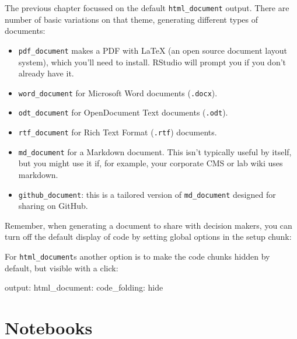 \documentclass[]{book}
\newenvironment{Shaded}{\begin{snugshade}}{\end{snugshade}}
\newcommand{\KeywordTok}[1]{\textcolor[rgb]{0.13,0.29,0.53}{\textbf{{#1}}}}
\newcommand{\DataTypeTok}[1]{\textcolor[rgb]{0.13,0.29,0.53}{{#1}}}
\newcommand{\OtherTok}[1]{\textcolor[rgb]{0.56,0.35,0.01}{{#1}}}
\newcommand{\FunctionTok}[1]{\textcolor[rgb]{0.00,0.00,0.00}{{#1}}}
\newcommand{\NormalTok}[1]{{#1}}
\begin{document}
The previous chapter focussed on the default \texttt{html\_document}
output. There are number of basic variations on that theme, generating
different types of documents:

\begin{itemize}
\item
  \texttt{pdf\_document} makes a PDF with LaTeX (an open source document
  layout system), which you'll need to install. RStudio will prompt you
  if you don't already have it.
\item
  \texttt{word\_document} for Microsoft Word documents (\texttt{.docx}).
\item
  \texttt{odt\_document} for OpenDocument Text documents
  (\texttt{.odt}).
\item
  \texttt{rtf\_document} for Rich Text Format (\texttt{.rtf}) documents.
\item
  \texttt{md\_document} for a Markdown document. This isn't typically
  useful by itself, but you might use it if, for example, your corporate
  CMS or lab wiki uses markdown.
\item
  \texttt{github\_document}: this is a tailored version of
  \texttt{md\_document} designed for sharing on GitHub.
\end{itemize}

Remember, when generating a document to share with decision makers, you
can turn off the default display of code by setting global options in
the setup chunk:

\begin{Shaded}
\end{Shaded}

For \texttt{html\_document}s another option is to make the code chunks
hidden by default, but visible with a click:

\begin{Shaded}
\begin{Highlighting}[]
\FunctionTok{output:}
  \FunctionTok{html_document:}
    \FunctionTok{code_folding:} \NormalTok{hide}
\end{Highlighting}
\end{Shaded}

\section{Notebooks}\label{notebooks}
\end{document}
